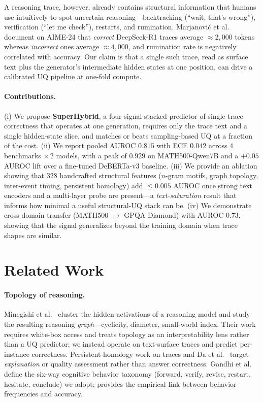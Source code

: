 \documentclass{article}
\begin{document}
A reasoning trace, however, already contains structural information that humans
use intuitively to spot uncertain reasoning---backtracking (``wait, that's
wrong''), verification (``let me check''), restarts, and rumination.
Marjanovi\'{c} et al.~\cite{thoughtology} document on AIME-24 that
\emph{correct} DeepSeek-R1 traces average $\approx 2{,}000$ tokens whereas
\emph{incorrect} ones average $\approx 4{,}000$, and rumination rate is
negatively correlated with accuracy. Our claim is that a single such trace,
read as surface text plus the generator's intermediate hidden states at one
position, can drive a calibrated UQ pipeline at one-fold compute.

\paragraph{Contributions.}
(i) We propose \textbf{SuperHybrid}, a four-signal stacked predictor of
single-trace correctness that operates at one generation, requires only the
trace text and a single hidden-state slice, and matches or beats sampling-based
UQ at a fraction of the cost.
(ii) We report pooled AUROC $0.815$ with ECE $0.042$ across $4$ benchmarks
$\times\,2$ models, with a peak of $0.929$ on MATH500-Qwen7B and a $+0.05$
AUROC lift over a fine-tuned DeBERTa-v3 baseline.
(iii) We provide an ablation showing that $328$ handcrafted structural features
($n$-gram motifs, graph topology, inter-event timing, persistent homology) add
$\le 0.005$ AUROC once strong text encoders and a multi-layer probe are
present---a \emph{text-saturation} result that informs how minimal a useful
structural-UQ stack can be.
(iv) We demonstrate cross-domain transfer (MATH500 $\to$ GPQA-Diamond) with
AUROC $0.73$, showing that the signal generalizes beyond the training domain
when trace shapes are similar.

\section{Related Work}

\paragraph{Topology of reasoning.} Minegishi et al.~\cite{topology} cluster
the hidden activations of a reasoning model and study the resulting reasoning
\emph{graph}---cyclicity, diameter, small-world index. Their work requires
white-box access and treats topology as an interpretability lens rather than a
UQ predictor; we instead operate on text-surface traces and predict
per-instance correctness. Persistent-homology work on traces and Da et
al.~\cite{kdd2025} target \emph{explanation} or quality assessment rather than
answer correctness. Gandhi et al.~\cite{gandhi} define the six-way cognitive
behavior taxonomy (forward, verify, revise, restart, hesitate, conclude) we
adopt; \cite{thoughtology} provides the empirical link between behavior
frequencies and accuracy.
\end{document}
